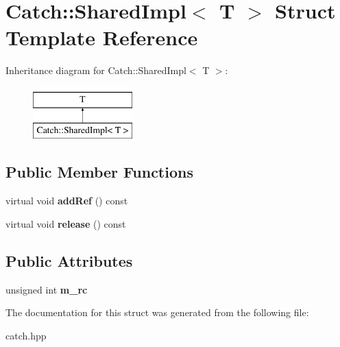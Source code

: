\hypertarget{structCatch_1_1SharedImpl}{}\section{Catch\+:\+:Shared\+Impl$<$ T $>$ Struct Template Reference}
\label{structCatch_1_1SharedImpl}
Inheritance diagram for Catch\+:\+:Shared\+Impl$<$ T $>$\+:\begin{figure}[H]
\begin{center}
\leavevmode
\includegraphics[height=2.000000cm]{structCatch_1_1SharedImpl}
\end{center}
\end{figure}
\subsection*{Public Member Functions}
\begin{DoxyCompactItemize}
\item 
\mbox{\label{structCatch_1_1SharedImpl_a5d1a4c96e8fc07c821890fd09749062e}} 
virtual void {\bfseries add\+Ref} () const
\item 
\mbox{\label{structCatch_1_1SharedImpl_ada8052c6f24fd73ec099333626f106fe}} 
virtual void {\bfseries release} () const
\end{DoxyCompactItemize}
\subsection*{Public Attributes}
\begin{DoxyCompactItemize}
\item 
\mbox{\label{structCatch_1_1SharedImpl_a7e71ef1985b85aa41a1632f932a96bcb}} 
unsigned int {\bfseries m\+\_\+rc}
\end{DoxyCompactItemize}


The documentation for this struct was generated from the following file\+:\begin{DoxyCompactItemize}
\item 
catch.\+hpp\end{DoxyCompactItemize}
